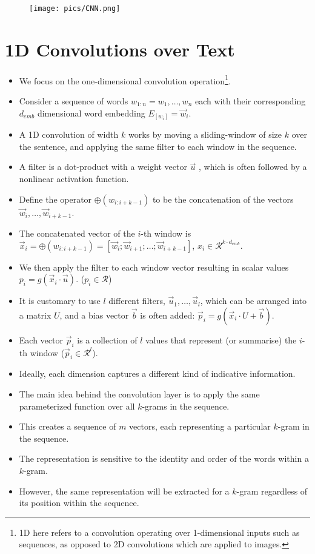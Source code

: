  \begin{figure}[h]
        	\texttt{[image: pics/CNN.png]}
        \end{figure}


\section{1D Convolutions over Text}
\begin{itemize}
\item We focus on the one-dimensional convolution operation\footnote{1D here refers to a convolution operating over 1-dimensional inputs such as sequences, as opposed to 2D convolutions which
are applied to images.}.
\item Consider a sequence of words $w_{1:n}=w_1 ,\dots,w_n$ each with their corresponding $d_{emb}$ dimensional word embedding $E_{[w_i]}=\vec{w}_{i}$.
\item A 1D convolution of width $k$ works by moving a sliding-window of size $k$ over the sentence, and applying the same filter to each window
in the sequence.
\item A filter is a dot-product with a weight vector $\vec{u}$ , which is often followed by a nonlinear activation function.
\item Define the operator $\oplus (w_{i:i+k-1})$ to be the concatenation of the vectors $\vec{w}_{i}, \dots, \vec{w}_{i+k-1}$.
\item The concatenated vector of the $i$-th window is $\vec{x}_{i}=\oplus (w_{i:i+k-1}) = [\vec{w}_{i};\vec{w}_{i+1};\dots;\vec{w}_{i+k-1}]$, $x_{i} \in \mathcal{R}^{k \cdot d_{emb}}$.
\item We then apply the filter to each window vector resulting in scalar values $p_{i} =  g(\vec{x}_{i} \cdot \vec{u})$. ($p_{i} \in \mathcal{R}$)
\item It is customary to use $l$ different filters, $\vec{u}_1,\dots, \vec{u}_l$, which can be arranged into a matrix $U$, and a bias vector $\vec{b}$ is often added: $\vec{p}_{i}=g(\vec{x}_{i}\cdot U +\vec{b})$.

\item Each vector $\vec{p}_i$ is a collection of $l$ values that represent (or summarise) the $i$-th window ($\vec{p}_{i} \in \mathcal{R}^l$). 
\item Ideally, each dimension captures a different kind of indicative information.
\item The main idea behind the convolution layer is to apply the same parameterized function over all $k$-grams in the sequence.
\item This creates a sequence of $m$ vectors, each representing
a particular $k$-gram in the sequence.
\item The representation is sensitive to the identity and order of the words within a $k$-gram.
\item However, the same representation will be extracted for a $k$-gram regardless of its position within the sequence.
\end{itemize}


